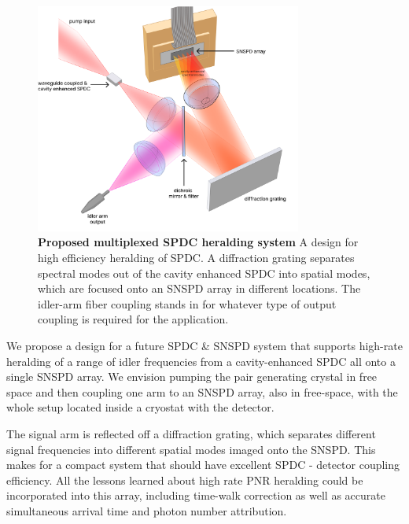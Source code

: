 \documentclass[11pt]{caltech_thesis} %
\begin{document}
\hypertarget{fig:final_setup}{%
\begin{figure}
\centering
\includegraphics[width=0.78\textwidth,height=\textheight]{./chapter_06/figs/final_setup_light.png}
\caption[{Proposed multiplexed SPDC heralding system}]{\textbf{Proposed multiplexed SPDC heralding system} A design for high efficiency heralding of SPDC. A diffraction grating separates spectral modes out of the cavity enhanced SPDC into spatial modes, which are focused onto an SNSPD array in different locations. The idler-arm fiber coupling stands in for whatever type of output coupling is required for the application.}
\label{fig:final_setup}
\end{figure}
}

We propose a design for a future SPDC \& SNSPD system that supports high-rate heralding of a range of idler frequencies from a cavity-enhanced SPDC all onto a single SNSPD array. We envision pumping the pair generating crystal in free space and then coupling one arm to an SNSPD array, also in free-space, with the whole setup located inside a cryostat with the detector.

The signal arm is reflected off a diffraction grating, which separates different signal frequencies into different spatial modes imaged onto the SNSPD. This makes for a compact system that should have excellent SPDC - detector coupling efficiency. All the lessons learned about high rate PNR heralding could be incorporated into this array, including time-walk correction as well as accurate simultaneous arrival time and photon number attribution.
\end{document}
